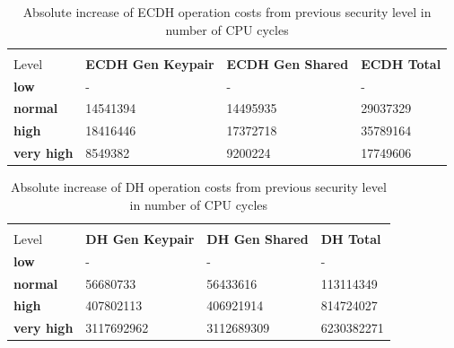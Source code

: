   \begin{table}[]
  \begin{tabular}{|l|l|l|l|}
  \hline
   \backslashbox{Security\\Level}{Operation}                   & \textbf{ECDH Gen Keypair} & \textbf{ECDH Gen Shared} & \textbf{ECDH Total} \\ \hline
  \textbf{low}       & -                         & -                        & -                   \\ \hline
  \textbf{normal}    & 14541394                  & 14495935                 & 29037329            \\ \hline
  \textbf{high}      & 18416446                  & 17372718                 & 35789164            \\ \hline
  \textbf{very high} & 8549382                   & 9200224                  & 17749606            \\ \hline
  \end{tabular}
  \centering \caption{\label{table:ecdh-absolute-cost-increase} Absolute increase of ECDH operation costs from previous security level in number of CPU cycles}
  \end{table}
  
  \begin{table}[]
	  \begin{tabular}{|l|l|l|l|}
	  \hline
	   \backslashbox{Security\\ Level}{Operation}                   & \textbf{DH Gen Keypair} & \textbf{DH Gen Shared} & \textbf{DH Total} \\ \hline
	  \textbf{low}       & -                       & -                      & -                 \\ \hline
	  \textbf{normal}    & 56680733                & 56433616               & 113114349         \\ \hline
	  \textbf{high}      & 407802113               & 406921914              & 814724027         \\ \hline
	  \textbf{very high} & 3117692962              & 3112689309             & 6230382271        \\ \hline
	  \end{tabular}
	  \centering \caption{\label{table:dh-absolute-cost-increase} Absolute increase of DH operation costs from previous security level in number of CPU cycles}
  \end{table}
  
